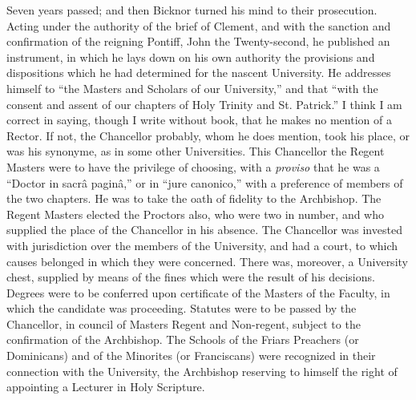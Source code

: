 Seven years passed; and then
Bicknor turned his mind to their prosecution. Acting under the
authority of the brief of Clement, and with the sanction and
confirmation of the reigning Pontiff, John the Twenty-second, he
published an instrument, in which he lays down on his own authority
the provisions and dispositions which he had determined for the
nascent University. He addresses himself to ``the Masters and
Scholars of our University,'' and that ``with the consent and
assent of our chapters of Holy Trinity and St. Patrick.'' I think I
am correct in saying, though I write without book, that he makes no
mention of a Rector. If not, the Chancellor probably, whom he does
mention, took his place, or was his synonyme, as in some other
Universities. This Chancellor the Regent Masters were to have the
privilege of choosing, with a \emph{proviso} that he was a ``Doctor
in sacrâ paginâ,'' or in ``jure canonico,'' with a preference of
members of the two chapters. He was to take the oath of fidelity to
the Archbishop. The Regent Masters elected the Proctors also, who were
two in number, and who supplied the place of the Chancellor in his
absence. The Chancellor was invested with jurisdiction over the
members of the University, and had a court, to which causes belonged
in which they were concerned. There was, moreover, a University chest,
supplied by means of the fines which were the result of his decisions.
Degrees were to be conferred upon certificate of the Masters of the
Faculty, in which the candidate was proceeding. Statutes were to be
passed by the Chancellor, in council of Masters Regent and Non-regent,
subject to the confirmation of the Archbishop. The Schools of the
Friars Preachers (or Dominicans) and of the Minorites (or Franciscans)
were recognized in their connection with the University, the
Archbishop reserving to himself the right of appointing a Lecturer in
Holy Scripture.

